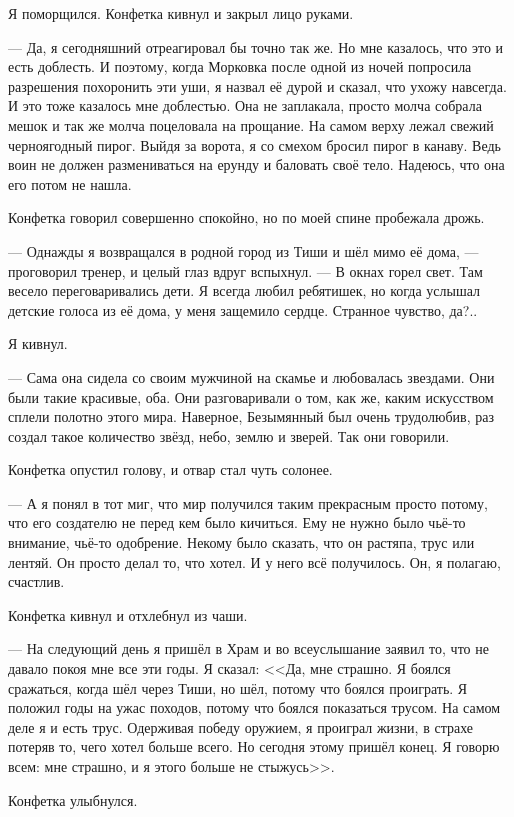 Я поморщился.
Конфетка кивнул и закрыл лицо руками.

--- Да, я сегодняшний отреагировал бы точно так же.
Но мне казалось, что это и есть доблесть.
И поэтому, когда Морковка после одной из ночей попросила разрешения похоронить эти уши, я назвал её дурой и сказал, что ухожу навсегда.
И это тоже казалось мне доблестью.
Она не заплакала, просто молча собрала мешок и так же молча поцеловала на прощание.
На самом верху лежал свежий черноягодный пирог.
Выйдя за ворота, я со смехом бросил пирог в канаву.
Ведь воин не должен размениваться на ерунду и баловать своё тело.
Надеюсь, что она его потом не нашла.

Конфетка говорил совершенно спокойно, но по моей спине пробежала дрожь.

--- Однажды я возвращался в родной город из Тиши и шёл мимо её дома, --- проговорил тренер, и целый глаз вдруг вспыхнул.
--- В окнах горел свет.
Там весело переговаривались дети.
Я всегда любил ребятишек, но когда услышал детские голоса из её дома, у меня защемило сердце.
Странное чувство, да?..

Я кивнул.

--- Сама она сидела со своим мужчиной на скамье и любовалась звездами.
Они были такие красивые, оба.
Они разговаривали о том, как же, каким искусством сплели полотно этого мира.
Наверное, Безымянный был очень трудолюбив, раз создал такое количество звёзд, небо, землю и зверей.
Так они говорили.

Конфетка опустил голову, и отвар стал чуть солонее.

--- А я понял в тот миг, что мир получился таким прекрасным просто потому, что его создателю не перед кем было кичиться.
Ему не нужно было чьё-то внимание, чьё-то одобрение.
Некому было сказать, что он растяпа, трус или лентяй.
Он просто делал то, что хотел.
И у него всё получилось.
Он, я полагаю, счастлив.

Конфетка кивнул и отхлебнул из чаши.

--- На следующий день я пришёл в Храм и во всеуслышание заявил то, что не давало покоя мне все эти годы.
Я сказал: <<Да, мне страшно.
Я боялся сражаться, когда шёл через Тиши, но шёл, потому что боялся проиграть.
Я положил годы на ужас походов, потому что боялся показаться трусом.
На самом деле я и есть трус.
Одерживая победу оружием, я проиграл жизни, в страхе потеряв то, чего хотел больше всего.
Но сегодня этому пришёл конец.
Я говорю всем: мне страшно, и я этого больше не стыжусь>>.

Конфетка улыбнулся.

